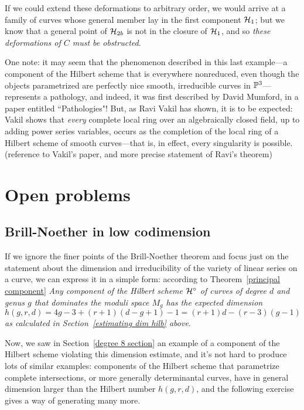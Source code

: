 If we could extend these deformations to arbitrary order, we would arrive at a family of curves whose general member lay in the first component $\cH_1$; but we know that a general point of $\cH_{2b}$ is not in the closure of $\cH_1$, and so \emph{these deformations of $C$ must be obstructed}.

One note: it may seem that the phenomenon described in this last example---a component of the Hilbert scheme that is everywhere nonreduced, even though the objects parametrized are perfectly nice smooth, irreducible curves in $\PP^3$---represents a pathology, and indeed, it was first described by David Mumford, in a paper entitled ``Pathologies"! But, as Ravi Vakil has shown, it is to be expected: Vakil shows that \emph{every} complete local ring over an algebraically closed field, up to adding power series variables, occurs as the completion of the local ring of a Hilbert scheme of smooth curves---that is, in effect, every singularity is possible. (reference to Vakil's paper, and more precise statement of Ravi's theorem)

\section{Open problems}\label{open problems}

\subsection{Brill-Noether in low codimension}

If we ignore the finer points of the Brill-Noether theorem and focus just on the statement about the dimension and irreducibility of the variety of linear series on a curve, we can express it in a simple form: according to Theorem~\ref{principal component} \emph{Any component of the Hilbert scheme $\cH^\circ$ of curves of degree $d$ and genus $g$ that dominates the moduli space $M_g$ has the expected dimension 
$$
h(g,r,d) = 4g-3 + (r+1)(d-g+1) - 1 = (r+1)d - (r-3)(g-1)
$$
 as calculated in Section~\ref{estimating dim hilb} above}.
 
 
Now, we saw in Section~\ref{degree 8 section} an example of a component of the Hilbert scheme violating this dimension estimate, and it's not hard to produce lots of similar examples: components of the Hilbert scheme that parametrize complete intersections, or more generally determinantal curves, have in general dimension larger than the Hilbert number $h(g,r,d)$, and the following exercise gives a way of generating many more.

